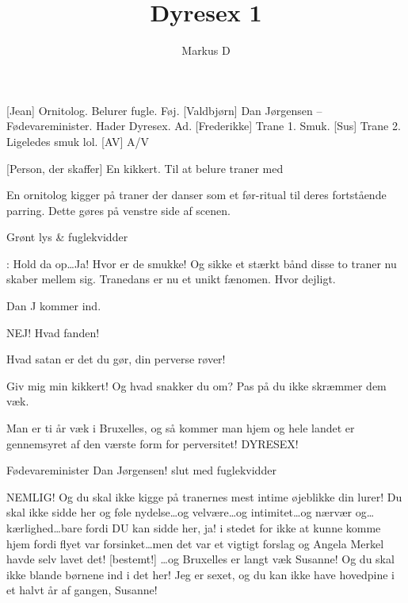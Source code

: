 \documentclass[a4paper,11pt]{article}
\title{Dyresex 1}
\author{Markus D}
\begin{document}
\maketitle

\begin{roles}
    [Jean] Ornitolog. Belurer fugle. Føj.
    [Valdbjørn] Dan Jørgensen -- Fødevareminister. Hader Dyresex. Ad.
    [Frederikke] Trane 1. Smuk. 
    [Sus] Trane 2. Ligeledes smuk lol.
    [AV] A/V
\end{roles}

\begin{props}
    [Person, der skaffer] En kikkert. Til at belure traner med
\end{props}


\begin{sketch}


\scene En ornitolog kigger på traner der danser som et før-ritual til deres fortstående parring. Dette gøres på venstre side af scenen.

\scene Grønt lys \& fuglekvidder

: Hold da op\ldots Ja! Hvor er de smukke! Og sikke et stærkt bånd disse to traner nu skaber mellem sig. Tranedans er nu et unikt fænomen. Hvor dejligt.

\scene Dan J kommer ind.

 NEJ! Hvad fanden! 

 Hvad satan er det du gør, din perverse røver!

 Giv mig min kikkert! Og hvad snakker du om? Pas på du ikke
skræmmer dem væk.

 Man er ti år væk i Bruxelles, og så kommer man hjem og hele landet er gennemsyret af den værste form for perversitet! DYRESEX!

 Fødevareminister Dan Jørgensen! \scene slut med fuglekvidder

 NEMLIG! Og du skal ikke kigge på tranernes mest intime øjeblikke din lurer! Du skal ikke sidde her og føle nydelse\ldots og velvære\ldots og intimitet\ldots og nærvær og\ldots kærlighed\ldots bare fordi DU kan sidde her, ja!  i stedet for ikke at kunne komme hjem fordi flyet var forsinket\ldots {}men det var et vigtigt forslag og Angela Merkel havde selv lavet det!
[bestemt!] \ldots og Bruxelles er langt væk Susanne! Og du skal ikke blande børnene ind i det her!  Jeg er sexet, og du kan ikke have hovedpine i et halvt år af gangen, Susanne!


\end{sketch}
\end{document}
